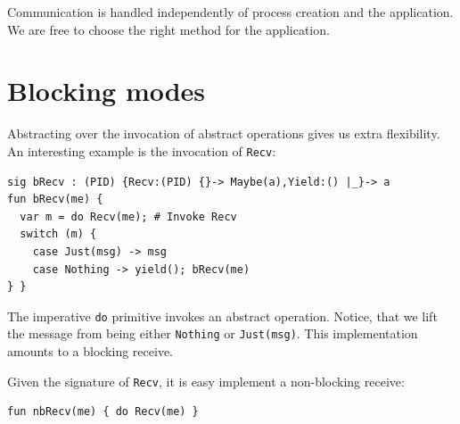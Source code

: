 \documentclass[noback,landscape]{infposter}
\begin{document}
Communication is handled independently of process creation and the
application. We are free to choose the right method for the application.


\section{Blocking modes}
Abstracting over the invocation of abstract operations gives us extra
flexibility. An interesting example is the invocation of
\lstinline$Recv$:
\begin{lstlisting}
sig bRecv : (PID) {Recv:(PID) {}-> Maybe(a),Yield:() |_}-> a
fun bRecv(me) {
  var m = do Recv(me); # Invoke Recv
  switch (m) {
    case Just(msg) -> msg
    case Nothing -> yield(); bRecv(me)
} }
\end{lstlisting}
The imperative \lstinline$do$ primitive invokes an abstract
operation. Notice, that we lift the message from being either
\lstinline$Nothing$ or \lstinline$Just(msg)$. This implementation
amounts to a blocking receive.

Given the signature of \lstinline$Recv$, it is easy implement a non-blocking receive: 
\begin{lstlisting}
fun nbRecv(me) { do Recv(me) }
\end{lstlisting}
\end{document}
